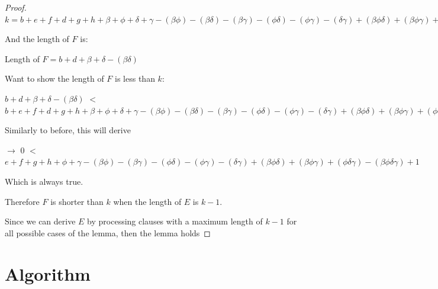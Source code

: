 \documentclass[manuscript]{acmart}
\begin{document}
\begin{proof}
        $k = b + e + f + d + g + h 
            + \beta + \phi + \delta + \gamma
            - (\beta \phi) - (\beta \delta) - (\beta \gamma) - (\phi \delta) - (\phi \gamma) - (\delta \gamma)
            + (\beta \phi \delta) + (\beta \phi \gamma) + (\phi \delta \gamma)
            - (\beta \phi \delta \gamma)
            + 1
            $

        And the length of $F$ is:

        Length of $F = b + d + \beta + \delta - (\beta \delta)$

        Want to show the length of $F$ is less than $k$:

        $b + d + \beta + \delta - (\beta \delta)$
        $<$
        $b + e + f + d + g + h 
            + \beta + \phi + \delta + \gamma
            - (\beta \phi) - (\beta \delta) - (\beta \gamma) - (\phi \delta) - (\phi \gamma) - (\delta \gamma)
            + (\beta \phi \delta) + (\beta \phi \gamma) + (\phi \delta \gamma)
            - (\beta \phi \delta \gamma)
            + 1
        $

        Similarly to before, this will derive

        $\rightarrow$
        $0$
        $<$
        $e + f + g + h 
            + \phi + \gamma
            - (\beta \phi) - (\beta \gamma) - (\phi \delta) - (\phi \gamma) - (\delta \gamma)
            + (\beta \phi \delta) + (\beta \phi \gamma) + (\phi \delta \gamma)
            - (\beta \phi \delta \gamma)
            + 1
        $

        Which is always true.

        Therefore $F$ is shorter than $k$ when the length of $E$ is $k - 1$.

        Since we can derive $E$ by processing clauses with a maximum length of $k - 1$ for all possible cases of the lemma, then the lemma holds
    \end{proof}

    \section{Algorithm}
\end{document}
